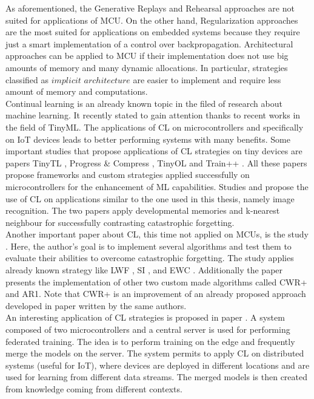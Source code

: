 \documentclass[12pt]{report}
\begin{document}
As aforementioned, the Generative Replays and Rehearsal approaches are not suited for applications of MCU. On the other hand, Regularization approaches are the most suited for applications on embedded systems because they require just a smart implementation of a control over backpropagation. Architectural approaches can be applied to MCU if their implementation does not use big amounts of memory and many dynamic allocations. In particular, strategies classified as $implicit$ $architecture$ are easier to implement and require less amount of memory and computations.\\

Continual learning is an already known topic in the filed of research about machine learning. It recently stated to gain attention thanks to recent works in the field of TinyML. The applications of CL on microcontrollers and specifically on IoT devices leads to better performing systems with many benefits. Some important studies that propose applications of CL strategies on tiny devices are papers TinyTL \cite{cai2020tinytl}, Progress \& Compress \cite{schwarz2018progress}, TinyOL \cite{ren2021tinyol} and Train++ \cite{sudharsan2021train++}. All these papers propose frameworks and custom strategies applied successfully on microcontrollers for the enhancement of ML capabilities. 
Studies \cite{park2020convolutional} and \cite{disabato2020incremental} propose the use of CL on applications similar to the one used in this thesis, namely image recognition. The two papers apply developmental memories and k-nearest neighbour for successfully contrasting catastrophic forgetting. \\
Another important paper about CL, this time not applied on MCUs, is the study \cite{maltoni2019continuous}. Here, the author's goal is to implement several algorithms and test them to evaluate their abilities to overcome catastrophic forgetting. The study applies already known strategy like LWF \cite{li2017learning}, SI \cite{zenke2017continual}, and EWC \cite{kirkpatrick2017overcoming}. Additionally the paper presents the implementation of other two custom made algorithms called CWR+ and AR1. Note that CWR+ is an improvement of an already proposed approach developed in paper \cite{lomonaco2017core50} written by the same authors. \\
An interesting application of CL strategies is proposed in paper \cite{grau2021device}. A system composed of two microcontrollers and a central server is used for performing federated training. The idea is to perform training on the edge and frequently merge the models on the server. The system permits to apply CL on distributed systems (useful for IoT), where devices are deployed in different locations and are used for learning from different data streams. The merged models is then created from knowledge coming from different contexts.
\end{document}
